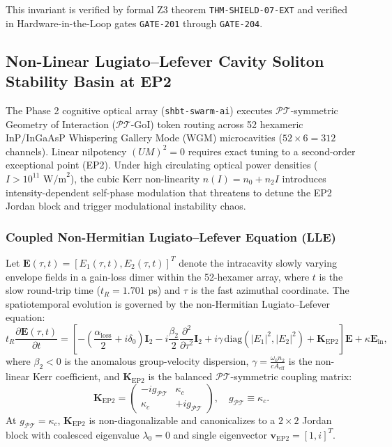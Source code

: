 \documentclass[11pt,onecolumn]{article}
\begin{document}
This invariant is verified by formal Z3 theorem \texttt{THM-SHIELD-07-EXT} and verified in Hardware-in-the-Loop gates \texttt{GATE-201} through \texttt{GATE-204}.

\FloatBarrier
\FloatBarrier
\subsection{Non-Linear Lugiato--Lefever Cavity Soliton Stability Basin at EP2}
\label{sec:lugiato_ep2}

The Phase 2 cognitive optical array (\texttt{shbt-swarm-ai}) executes $\mathcal{PT}$-symmetric Geometry of Interaction ($\mathcal{PT}$-GoI) token routing across 52 hexameric InP/InGaAsP Whispering Gallery Mode (WGM) microcavities ($52 \times 6 = 312$ channels). Linear nilpotency $(UM)^2 = 0$ requires exact tuning to a second-order exceptional point (EP2). Under high circulating optical power densities ($I > 10^{11}\text{ W/m}^2$), the cubic Kerr non-linearity $n(I) = n_0 + n_2 I$ introduces intensity-dependent self-phase modulation that threatens to detune the EP2 Jordan block and trigger modulational instability chaos.

\subsubsection{Coupled Non-Hermitian Lugiato--Lefever Equation (LLE)}
Let $\mathbf{E}(\tau, t) = [E_1(\tau,t), E_2(\tau,t)]^T$ denote the intracavity slowly varying envelope fields in a gain-loss dimer within the 52-hexamer array, where $t$ is the slow round-trip time ($t_R = 1.701\text{ ps}$) and $\tau$ is the fast azimuthal coordinate. The spatiotemporal evolution is governed by the non-Hermitian Lugiato--Lefever equation:
\begin{equation}
t_R \frac{\partial \mathbf{E}(\tau, t)}{\partial t} = \left[ -\left(\frac{\alpha_{\mathrm{loss}}}{2} + i\delta_0\right)\mathbf{I}_2 - i\frac{\beta_2}{2}\frac{\partial^2}{\partial\tau^2}\mathbf{I}_2 + i\gamma\,\mathrm{diag}\left(|E_1|^2, |E_2|^2\right) + \mathbf{K}_{\mathrm{EP2}} \right]\mathbf{E} + \kappa\mathbf{E}_{\mathrm{in}},
\label{eq:lle_ep2}
\end{equation}
where $\beta_2 < 0$ is the anomalous group-velocity dispersion, $\gamma = \frac{\omega_0 n_2}{c A_{\mathrm{eff}}}$ is the non-linear Kerr coefficient, and $\mathbf{K}_{\mathrm{EP2}}$ is the balanced $\mathcal{PT}$-symmetric coupling matrix:
\begin{equation}
\mathbf{K}_{\mathrm{EP2}} = \begin{pmatrix} -ig_{\mathcal{PT}} & \kappa_c \\ \kappa_c & +ig_{\mathcal{PT}} \end{pmatrix}, \quad g_{\mathcal{PT}} \equiv \kappa_c.
\end{equation}
At $g_{\mathcal{PT}} = \kappa_c$, $\mathbf{K}_{\mathrm{EP2}}$ is non-diagonalizable and canonicalizes to a $2 \times 2$ Jordan block with coalesced eigenvalue $\lambda_0 = 0$ and single eigenvector $\mathbf{v}_{\mathrm{EP2}} = [1, i]^T$.
\end{document}

